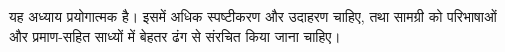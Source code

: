 \documentclass[../../../include/open-logic-chapter]{subfiles}
\begin{document}

\begin{editorial}
  यह अध्याय प्रयोगात्मक है। इसमें अधिक स्पष्टीकरण और उदाहरण चाहिए, तथा
  सामग्री को परिभाषाओं और प्रमाण-सहित साध्यों में बेहतर ढंग से संरचित किया
  जाना चाहिए।
\end{editorial}


\OLEndChapterHook
\end{document}
